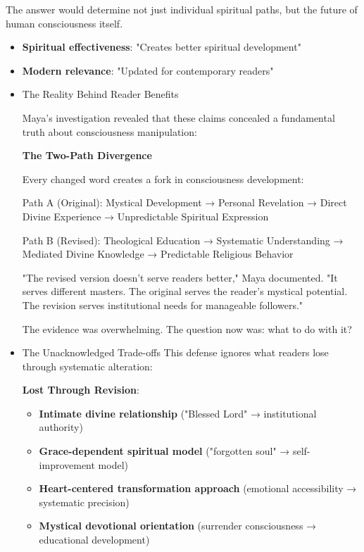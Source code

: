 \documentclass[11pt,twoside]{book}
\begin{document}
The answer would determine not just individual spiritual paths, but the future of human consciousness itself.
\begin{itemize}
\item \textbf{\textbf{Spiritual effectiveness}}: "Creates better spiritual development"
\item \textbf{\textbf{Modern relevance}}: "Updated for contemporary readers"
\end{itemize}
\begin{itemize}
\item The Reality Behind Reader Benefits
\label{sec:org38f3610}

Maya's investigation revealed that these claims concealed a fundamental truth about consciousness manipulation:

\textbf{\textbf{The Two-Path Divergence}}

Every changed word creates a fork in consciousness development:

Path A (Original): 
Mystical Development → Personal Revelation → Direct Divine Experience → Unpredictable Spiritual Expression

Path B (Revised):
Theological Education → Systematic Understanding → Mediated Divine Knowledge → Predictable Religious Behavior

"The revised version doesn't serve readers better," Maya documented. "It serves different masters. The original serves the reader's mystical potential. The revision serves institutional needs for manageable followers."

The evidence was overwhelming. The question now was: what to do with it?
\item The Unacknowledged Trade-offs
\label{sec:orga604639}
This defense ignores what readers lose through systematic alteration:

\textbf{\textbf{Lost Through Revision}}:
\begin{itemize}
\item \textbf{\textbf{Intimate divine relationship}} ("Blessed Lord" → institutional authority)
\item \textbf{\textbf{Grace-dependent spiritual model}} ("forgotten soul" → self-improvement model)
\item \textbf{\textbf{Heart-centered transformation approach}} (emotional accessibility → systematic precision)
\item \textbf{\textbf{Mystical devotional orientation}} (surrender consciousness → educational development)
\end{itemize}


\end{itemize}
\end{document}
